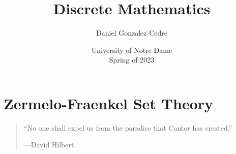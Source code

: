 





\title{Discrete Mathematics}
\author{Daniel Gonzalez Cedre}
\date{University of Notre Dame \\ Spring of 2023}
\maketitle

\setcounter{chapter}{2}
\chapter{Zermelo-Fraenkel Set Theory}
\begin{quote}
    ``No one shall expel us from the paradise that Cantor has created.''
    \begin{flushright}
        ---David Hilbert
    \end{flushright}
\end{quote}

